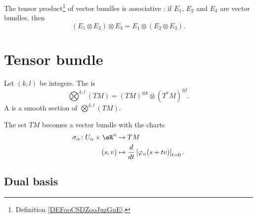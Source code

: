 \begin{proposition}		\label{PROPooEYSWooOeQNyX}
	The tensor product\footnote{Definition \ref{DEFooCSDZooJuzGuE}.} of vector bundles is associative : if \( E_1\), \( E_2\) and \( E_3\) are vector bundles, then
	\begin{equation}
		(E_1\otimes E_2)\otimes E_3=E_1\otimes (E_2\otimes E_3).
	\end{equation}
\end{proposition}


\section{Tensor bundle}

\begin{definition}
	Let \( (k,l)\) be integers. The  is
	\begin{equation}
		\bigotimes^{k,l}(TM)=(TM)^{\otimes k}\otimes (T^*M)^{\otimes l}.
	\end{equation}
	A  is a smooth section of \( \bigotimes^{k,l}(TM)\).
\end{definition}

\begin{proposition}		\label{PROPooIMOJooKzEDXA}
	The set \( TM\) becomes a vector bundle with the charts
	\begin{equation}
		\begin{aligned}
			\sigma_{\alpha}\colon U_{\alpha}\times \eR^n & \to TM                                                              \\
			(s,v)                                        & \mapsto  \frac{d}{dt} \left[ \varphi_{\alpha}(s+tv)  \right]_{t=0}.
		\end{aligned}
	\end{equation}
\end{proposition}

\noproof


\subsection{Dual basis}


